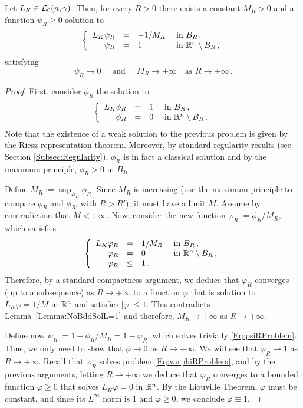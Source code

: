 \begin{lemma}
	\label{Lemma:SolBallToZero}
	Let $L_K \in \mathcal{L}_0(n,\gamma)$. Then, for every $R>0$ there exists a constant $M_R>0$ and a function $\psi_R\geq 0$ solution to
	\begin{equation}
	\label{Eq:psiRProblem}
	\left\{\begin{array}{rcll}
	L_K  \psi_R &=& -1/M_R & \textrm{ in } B_R\,,\\
	\psi_R &=& 1 & \textrm{ in } \mathbb{R}^n\setminus B_R\,,
	\end{array} \right.
	\end{equation}
	satisfying 
	$$
	 \psi_R \to  0 \quad \text{ and } \quad M_R  \to +\infty \quad \text{as } R\to +\infty\,.
	$$
\end{lemma}

\begin{proof}
	First, consider $\phi_R$ the solution to
	\begin{equation*}
	\left\{\begin{array}{rcll}
	L_K  \phi_R &=& 1 & \textrm{ in } B_R\,,\\
	\phi_R &=& 0 & \textrm{ in } \mathbb{R}^n\setminus B_R\,.
	\end{array} \right.
	\end{equation*}
	Note that the existence of a weak solution to the previous problem is given by the Riesz representation theorem. Moreover, by standard regularity results (see Section \ref{Subsec:Regularity}), $\phi_R$ is in fact a classical solution and by the maximum principle, $\phi_R>0$ in $B_R$.
	
	Define $M_R := \sup_{B_R} \phi_R$. Since $M_R$ is increasing (use the maximum principle to compare $\phi_R$ and $\phi_{R'}$ with $R>R'$), it must have a limit $M$. Assume by contradiction that $M<+\infty$. Now, consider the new function $ \varphi_R := \phi_R/M_R$, which satisfies
	\begin{equation}
	\label{Eq:varphiRProblem}
	\left\{\begin{array}{rcll}
	L_K  \varphi_R &=& 1/M_R & \textrm{ in } B_R\,,\\
	\varphi_R &=& 0 & \textrm{ in } \mathbb{R}^n\setminus B_R\,, \\
	\varphi_R &\leq & 1\,.
	\end{array} \right.
	\end{equation}
	Therefore, by a standard compactness argument, we deduce that $\varphi_R$ converges (up to a subsequence) as $R\to +\infty$ to a function $\varphi$ that is solution to $L_K  \varphi = 1/M$ in $\mathbb{R}^n$ and satisfies  $|\varphi| \leq 1$. This contradicts Lemma~\ref{Lemma:NoBddSolL=1} and therefore, $M_R \to +\infty$ as $R\to +\infty$. 
	
	Define now $\psi_R := 1-\phi_R/M_R = 1-\varphi_R$, which solves trivially \eqref{Eq:psiRProblem}. Thus, we only need to show that $\phi \to 0$ as $R\to +\infty$. We will see that $\varphi_R \to	1$ as $R\to +\infty$. Recall that $\varphi_R$ solves problem \eqref{Eq:varphiRProblem}, and by the previous 	arguments, letting $R\to +\infty$ we deduce that $\varphi_R$ converges to a bounded function $\varphi\geq 0$ that solves $ L_K \varphi = 0 $ in $\mathbb{R}^n$. By the Liouville Theorem, $\varphi$ must be constant, and since its $L^\infty$ norm is $1$ and $\varphi\geq 0$, we conclude $\varphi\equiv 1$.	
\end{proof}

